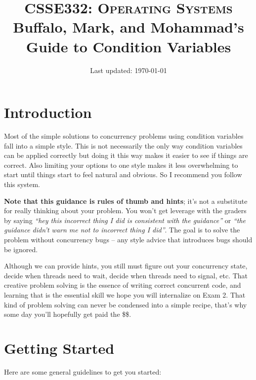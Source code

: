 \documentclass[11pt,usletter]{article}
\title{%
  {\huge CSSE332: \textsc{Operating Systems}}\\%
  \vspace{2em}
  Buffalo, Mark, and Mohammad's Guide to Condition Variables}
\date{Last updated: \today}
\begin{document}
\maketitle

\section{Introduction}

Most of the simple solutions to concurrency problems using condition variables
fall into a simple style.  This is not necessarily the only way condition
variables can be applied correctly but doing it this way makes it easier to see
if things are correct.  Also limiting your options to one style makes it less
overwhelming to start until things start to feel natural and obvious.  So I
recommend you follow this system.

{\bf Note that this guidance is rules of thumb and hints}; it’s not a
substitute for really thinking about your problem.  You won’t get leverage with
the graders by saying {\em ``hey this incorrect thing I did is consistent with
the guidance''} or {\em ``the guidance didn’t warn me not to incorrect thing I
did''}.  The goal is to solve the problem without concurrency bugs – any style
advice that introduces bugs should be ignored.

Although we can provide hints, you still must figure out your concurrency
state, decide when threads need to wait, decide when threads need to signal,
etc. That creative problem solving is the essence of writing correct concurrent
code, and learning that is the essential skill we hope you will internalize on
Exam 2.  That kind of problem solving can never be condensed into a simple
recipe, that's why some day you’ll hopefully get paid the \$\$.

\section{Getting Started}

Here are some general guidelines to get you started:
\end{document}
